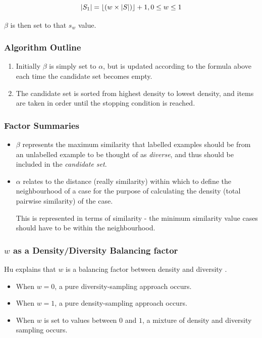 \documentclass[a4paper,11pt]{report}
\begin{document}
\[
\left|S_{1}\right|=\left\lfloor \left(w\times\left|S\right|\right)\right\rfloor +1,\hphantom{}0\leq w\leq 1
\]

$\beta$ is then set to that $s_{w}$ value.

\subsubsection{Algorithm Outline}
\begin{enumerate}
	\item Initially $\beta$ is simply set to $\alpha$, but is updated according to the formula above each time the candidate set becomes empty.
	\item The candidate set is sorted from highest density to lowest density, and items are taken in order until the stopping condition is reached.
\end{enumerate}

\subsubsection{Factor Summaries}
\begin{itemize}
	\item $\beta$ represents the maximum similarity that labelled examples should be from an unlabelled example to be thought of as \emph{diverse}, and thus should be included in the \emph{candidate set}.

	\item $\alpha$ relates to the distance (really similarity) within which to define the neighbourhood of a case for the purpose of calculating the density (total pairwise similarity) of the case. 
	
	This is represented in terms of similarity - the minimum similarity value cases should have to be within the neighbourhood.
	
\end{itemize}

\subsubsection{$w$ as a Density/Diversity Balancing factor}
Hu explains that $w$ is a balancing factor between density and diversity \citep{Hu2010}. 

\begin{itemize}
	\item When $w=0$, a pure diversity-sampling approach occurs. 
	\item When $w=1$, a pure density-sampling approach occurs. 
	\item When $w$ is set to values between $0$ and $1$, a mixture of density and diversity sampling occurs.
\end{itemize}
\end{document}
